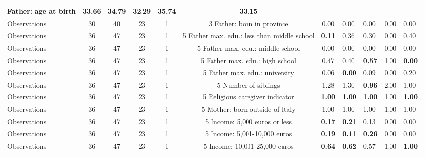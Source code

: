 \begin{tabular}{l c c c c c c }
Father: age at birth & \textbf{    33.66} &     34.79 & \textbf{    32.29} &     35.74 & \textbf{    33.15} \\
\midrule
Observations &        30 &        40 &        23 &         1 &         3
Father: born in province &      0.00 &      0.00 &      0.00 &      0.00 &      0.00 \\
\midrule
Observations &        36 &        47 &        23 &         1 &         5
Father max. edu.: less than middle school & \textbf{     0.11} &      0.36 &      0.30 &      0.00 &      0.40 \\
\midrule
Observations &        36 &        47 &        23 &         1 &         5
Father max. edu.: middle school &      0.00 &      0.00 &      0.00 &      0.00 &      0.00 \\
\midrule
Observations &        36 &        47 &        23 &         1 &         5
Father max. edu.: high school &      0.47 &      0.40 & \textbf{     0.57} &      1.00 & \textbf{     0.00} \\
\midrule
Observations &        36 &        47 &        23 &         1 &         5
Father max. edu.: university &      0.06 & \textbf{     0.00} &      0.09 &      0.00 &      0.20 \\
\midrule
Observations &        36 &        47 &        23 &         1 &         5
Number of siblings &      1.28 &      1.30 & \textbf{     0.96} &      2.00 &      1.00 \\
\midrule
Observations &        36 &        47 &        23 &         1 &         5
Religious caregiver indicator & \textbf{     1.00} & \textbf{     1.00} & \textbf{     1.00} &      1.00 & \textbf{     1.00} \\
\midrule
Observations &        36 &        47 &        23 &         1 &         5
Mother: born outside of Italy &      1.00 &      1.00 &      1.00 &      1.00 &      1.00 \\
\midrule
Observations &        36 &        47 &        23 &         1 &         5
Income: 5,000 euros or less & \textbf{     0.17} & \textbf{     0.21} &      0.13 &      0.00 &      0.00 \\
\midrule
Observations &        36 &        47 &        23 &         1 &         5
Income: 5,001-10,000 euros & \textbf{     0.19} & \textbf{     0.11} & \textbf{     0.26} &      0.00 &      0.00 \\
\midrule
Observations &        36 &        47 &        23 &         1 &         5
Income: 10,001-25,000 euros & \textbf{     0.64} & \textbf{     0.62} &      0.57 &      1.00 & \textbf{     1.00} \\

\end{tabular}
